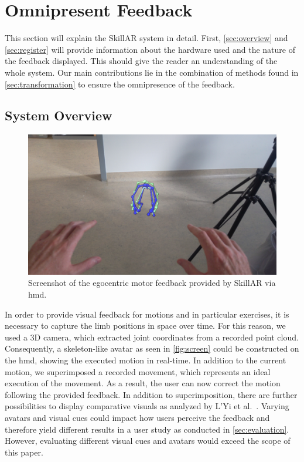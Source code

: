 \section{Omnipresent Feedback}
This section will explain the SkillAR system in detail. First, \autoref{sec:overview} and \autoref{sec:register} will provide information about the hardware used and the nature of the feedback displayed. This should give the reader an understanding of the whole system. Our main contributions lie in the combination of methods found in \autoref{sec:transformation} to ensure the omnipresence of the feedback.

\subsection{System Overview \label{sec:overview}}
\begin{figure}[b!]
	\centering
	\includegraphics[width=\linewidth]{pictures/HoloLensScreenshot.jpg}
	\caption[Screenshot of the motor feedback provided by SkillAR via \acrshort{hmd}.]{Screenshot of the egocentric motor feedback provided by SkillAR via \acrshort{hmd}. \label{fig:screen}}
\end{figure}
In order to provide visual feedback for motions and in particular exercises, it is necessary to capture the limb positions in space over time. For this reason, we used a 3D camera, which extracted joint coordinates from a recorded point cloud. Consequently, a skeleton-like avatar as seen in \autoref{fig:screen} could be constructed on the \acrshort{hmd}, showing the executed motion in real-time. In addition to the current motion, we superimposed a recorded movement, which represents an ideal execution of the movement. As a result, the user can now correct the motion following the provided feedback. In addition to superimposition, there are further possibilities to display comparative visuals as analyzed by L'Yi et al.~\cite{lyi2021comparative}. Varying avatars and visual cues could impact how users perceive the feedback and therefore yield different results in a user study as conducted in \autoref{sec:evaluation}. However, evaluating different visual cues and avatars would exceed the scope of this paper.



